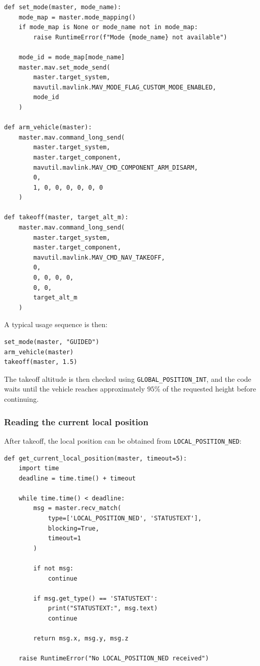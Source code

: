 \begin{verbatim}
def set_mode(master, mode_name):
    mode_map = master.mode_mapping()
    if mode_map is None or mode_name not in mode_map:
        raise RuntimeError(f"Mode {mode_name} not available")

    mode_id = mode_map[mode_name]
    master.mav.set_mode_send(
        master.target_system,
        mavutil.mavlink.MAV_MODE_FLAG_CUSTOM_MODE_ENABLED,
        mode_id
    )

def arm_vehicle(master):
    master.mav.command_long_send(
        master.target_system,
        master.target_component,
        mavutil.mavlink.MAV_CMD_COMPONENT_ARM_DISARM,
        0,
        1, 0, 0, 0, 0, 0, 0
    )

def takeoff(master, target_alt_m):
    master.mav.command_long_send(
        master.target_system,
        master.target_component,
        mavutil.mavlink.MAV_CMD_NAV_TAKEOFF,
        0,
        0, 0, 0, 0,
        0, 0,
        target_alt_m
    )
\end{verbatim}

A typical usage sequence is then:

\begin{verbatim}
set_mode(master, "GUIDED")
arm_vehicle(master)
takeoff(master, 1.5)
\end{verbatim}

The takeoff altitude is then checked using \texttt{GLOBAL\_POSITION\_INT}, and the code waits until the vehicle reaches approximately \(95\%\) of the requested height before continuing. 

\subsubsection{Reading the current local position}

After takeoff, the local position can be obtained from \texttt{LOCAL\_POSITION\_NED}:

\begin{verbatim}
def get_current_local_position(master, timeout=5):
    import time
    deadline = time.time() + timeout

    while time.time() < deadline:
        msg = master.recv_match(
            type=['LOCAL_POSITION_NED', 'STATUSTEXT'],
            blocking=True,
            timeout=1
        )

        if not msg:
            continue

        if msg.get_type() == 'STATUSTEXT':
            print("STATUSTEXT:", msg.text)
            continue

        return msg.x, msg.y, msg.z

    raise RuntimeError("No LOCAL_POSITION_NED received")
\end{verbatim}

